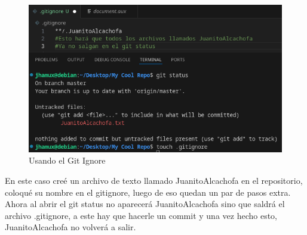 \documentclass[13pt]{article}
\begin{document}
\begin{figure}[H]
	\centering
	\includegraphics[scale=0.5]{Images/gitignore.png}
	\caption {\small Usando el Git Ignore}
\end{figure}

En este caso creé un archivo de texto llamado JuanitoAlcachofa en el repositorio, coloqué su nombre en el gitignore, luego de eso quedan un par de pasos extra.\\
Ahora al abrir el git status no aparecerá JuanitoAlcachofa sino que saldrá el archivo .gitignore, a este hay que hacerle un commit y una vez hecho esto, JuanitoAlcachofa no volverá a salir.
\end{document}

